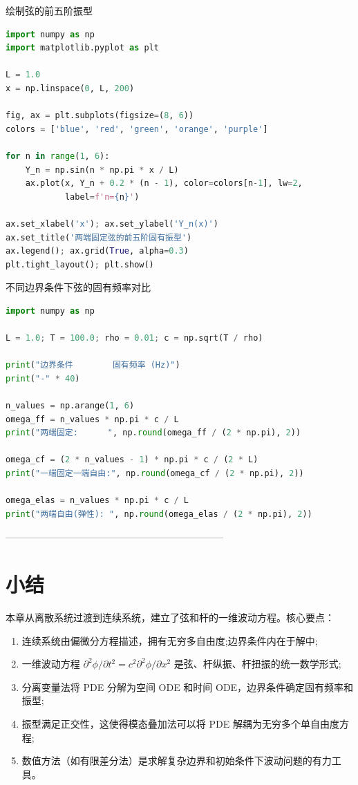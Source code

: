 \begin{mycode}{绘制弦的前五阶振型}
\begin{lstlisting}[language=Python]
import numpy as np
import matplotlib.pyplot as plt

L = 1.0
x = np.linspace(0, L, 200)

fig, ax = plt.subplots(figsize=(8, 6))
colors = ['blue', 'red', 'green', 'orange', 'purple']

for n in range(1, 6):
    Y_n = np.sin(n * np.pi * x / L)
    ax.plot(x, Y_n + 0.2 * (n - 1), color=colors[n-1], lw=2,
            label=f'n={n}')

ax.set_xlabel('x'); ax.set_ylabel('Y_n(x)')
ax.set_title('两端固定弦的前五阶固有振型')
ax.legend(); ax.grid(True, alpha=0.3)
plt.tight_layout(); plt.show()
\end{lstlisting}
\end{mycode}

\begin{mycode}{不同边界条件下弦的固有频率对比}
\begin{lstlisting}[language=Python]
import numpy as np

L = 1.0; T = 100.0; rho = 0.01; c = np.sqrt(T / rho)

print("边界条件        固有频率 (Hz)")
print("-" * 40)

n_values = np.arange(1, 6)
omega_ff = n_values * np.pi * c / L
print("两端固定:      ", np.round(omega_ff / (2 * np.pi), 2))

omega_cf = (2 * n_values - 1) * np.pi * c / (2 * L)
print("一端固定一端自由:", np.round(omega_cf / (2 * np.pi), 2))

omega_elas = n_values * np.pi * c / L
print("两端自由(弹性): ", np.round(omega_elas / (2 * np.pi), 2))
\end{lstlisting}
\end{mycode}

--------------------------------------------------------------------
\section{小结}

本章从离散系统过渡到连续系统，建立了弦和杆的一维波动方程。核心要点：

\begin{enumerate}
    \item 连续系统由偏微分方程描述，拥有无穷多自由度;边界条件内在于解中;
    \item 一维波动方程 $\partial^2\phi/\partial t^2=c^2\partial^2\phi/\partial x^2$ 是弦、杆纵振、杆扭振的统一数学形式;
    \item 分离变量法将 PDE 分解为空间 ODE 和时间 ODE，边界条件确定固有频率和振型;
    \item 振型满足正交性，这使得模态叠加法可以将 PDE 解耦为无穷多个单自由度方程;
    \item 数值方法（如有限差分法）是求解复杂边界和初始条件下波动问题的有力工具。
\end{enumerate}

